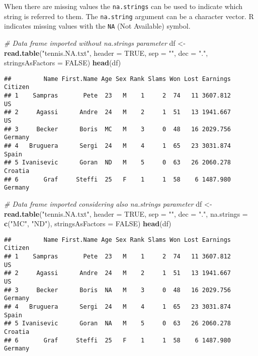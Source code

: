 \documentclass[]{book}
\newenvironment{Shaded}{\begin{snugshade}}{\end{snugshade}}
\newcommand{\KeywordTok}[1]{\textcolor[rgb]{0.13,0.29,0.53}{\textbf{{#1}}}}
\newcommand{\DataTypeTok}[1]{\textcolor[rgb]{0.13,0.29,0.53}{{#1}}}
\newcommand{\StringTok}[1]{\textcolor[rgb]{0.31,0.60,0.02}{{#1}}}
\newcommand{\CommentTok}[1]{\textcolor[rgb]{0.56,0.35,0.01}{\textit{{#1}}}}
\newcommand{\OtherTok}[1]{\textcolor[rgb]{0.56,0.35,0.01}{{#1}}}
\newcommand{\NormalTok}[1]{{#1}}
\begin{document}
When there are missing values the \texttt{na.strings} can be used to
indicate which string is referred to them. The \texttt{na.string}
argument can be a character vector. R indicates missing values with the
\texttt{NA} (Not Available) symbol.

\begin{Shaded}
\begin{Highlighting}[]
\CommentTok{# Data frame imported without na.strings parameter }
\NormalTok{df <-}\StringTok{ }\KeywordTok{read.table}\NormalTok{(}\StringTok{"tennis.NA.txt"}\NormalTok{, }\DataTypeTok{header =} \OtherTok{TRUE}\NormalTok{, }\DataTypeTok{sep =} \StringTok{""}\NormalTok{, }\DataTypeTok{dec =} \StringTok{"."}\NormalTok{, }\DataTypeTok{stringsAsFactors =} \OtherTok{FALSE}\NormalTok{)}
\KeywordTok{head}\NormalTok{(df)}
\end{Highlighting}
\end{Shaded}

\begin{verbatim}
##         Name First.Name Age Sex Rank Slams Won Lost Earnings Citizen
## 1    Sampras       Pete  23   M    1     2  74   11 3607.812      US
## 2     Agassi      Andre  24   M    2     1  51   13 1941.667      US
## 3     Becker      Boris  MC   M    3     0  48   16 2029.756 Germany
## 4   Bruguera      Sergi  24   M    4     1  65   23 3031.874   Spain
## 5 Ivanisevic      Goran  ND   M    5     0  63   26 2060.278 Croatia
## 6       Graf     Steffi  25   F    1     1  58    6 1487.980 Germany
\end{verbatim}

\begin{Shaded}
\begin{Highlighting}[]
\CommentTok{# Data frame imported considering also na.strings parameter}
\NormalTok{df <-}\StringTok{ }\KeywordTok{read.table}\NormalTok{(}\StringTok{"tennis.NA.txt"}\NormalTok{, }\DataTypeTok{header =} \OtherTok{TRUE}\NormalTok{, }\DataTypeTok{sep =} \StringTok{""}\NormalTok{, }\DataTypeTok{dec =} \StringTok{"."}\NormalTok{, }\DataTypeTok{na.strings =} \KeywordTok{c}\NormalTok{(}\StringTok{"MC"}\NormalTok{, }\StringTok{"ND"}\NormalTok{), }\DataTypeTok{stringsAsFactors =} \OtherTok{FALSE}\NormalTok{)}
\KeywordTok{head}\NormalTok{(df)}
\end{Highlighting}
\end{Shaded}

\begin{verbatim}
##         Name First.Name Age Sex Rank Slams Won Lost Earnings Citizen
## 1    Sampras       Pete  23   M    1     2  74   11 3607.812      US
## 2     Agassi      Andre  24   M    2     1  51   13 1941.667      US
## 3     Becker      Boris  NA   M    3     0  48   16 2029.756 Germany
## 4   Bruguera      Sergi  24   M    4     1  65   23 3031.874   Spain
## 5 Ivanisevic      Goran  NA   M    5     0  63   26 2060.278 Croatia
## 6       Graf     Steffi  25   F    1     1  58    6 1487.980 Germany
\end{verbatim}
\end{document}
